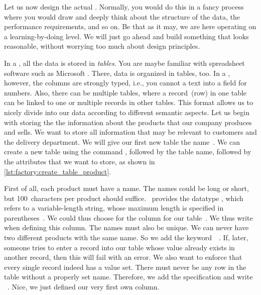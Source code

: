 %
%
%
Let us now design the actual \db.
Normally, you would do this in a fancy process where you would draw  and deeply think about the structure of the data, the performance requirements, and so on.
Be that as it may, we are here operating on a learning-by-doing level.
We will just go ahead and build something that looks reasonable, without worrying too much about design principles.

In a , all the data is stored in \emph{tables}.
You are maybe familiar with spreadsheet software such as Microsoft .
There, data is organized in tables, too.
In a , however, the columns are strongly typed, i.e., you cannot  a text into a field for numbers.
Also, there can be multiple tables, where a record~(row) in one table can be linked to one or multiple records in other tables.
This format allows us to nicely divide into our data according to different semantic aspects.%
%
%
%
Let us begin with storing the the information about the products that our company produces and sells.
We want to store all information that may be relevant to customers and the delivery department.
We will give our first new table the name~.%
%
%
%
%
%
%
We can create a new table using the command , followed by the table name, followed by the attributes that we want to store, as shown in \cref{lst:factory:create_table_product}.

First of all, each product must have a name.
The names could be long or short, but 100~characters per product should suffice.
\sql\ provides the datatype , which refers to a variable-length string, whose maximum length is specified in parentheses~\cite{PGDG:PD:CT}.
We could thus choose  for the column  for our table~.
We thus write~ when defining this column.
The names must also be unique.
We can never have two different products with the same name.
So we add the keyword~~\cite{PGDG:PD:C}.
If, later, someone tries to enter a record into our table whose  value already exists in another record, then this will fail with an error.
We also want to enforce that every single record indeed has a  value set.
There must never be any row in the table without a properly set name.
Therefore, we add the  specification and write ~\cite{PGDG:PD:C}.
Nice, we just defined our very first own column.

